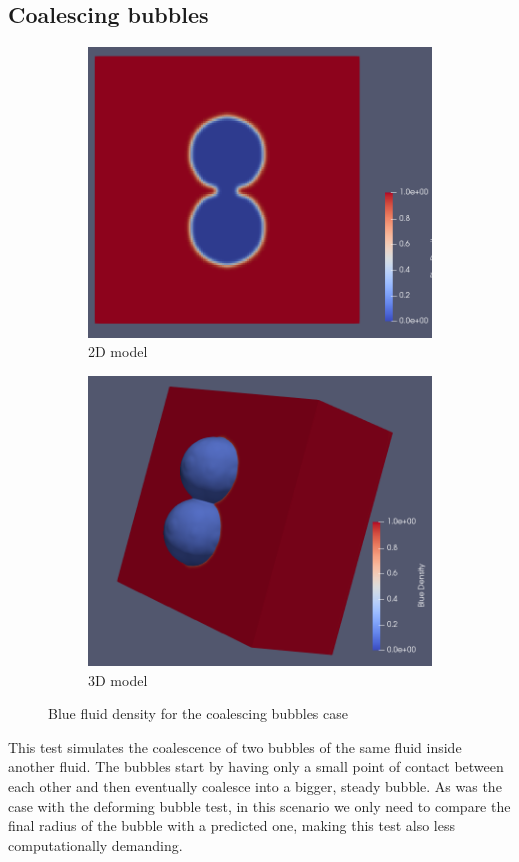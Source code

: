 \documentclass[12pt, openany]{book}
\begin{document}
\subsection{Coalescing bubbles}
\begin{figure}[H]
	\centering
	\begin{subfigure}{.49\textwidth}
		\includegraphics[width=\linewidth]{Resources/Images/coal.png}
		\caption{2D model}
	\end{subfigure}
	\begin{subfigure}{.49\textwidth}
		\includegraphics[width=\linewidth]{Resources/Images/coal3d.png}
		\caption{3D model}
	\end{subfigure} 
	\caption{Blue fluid density for the coalescing bubbles case}
	\label{fig:coalescence}
\end{figure} 
This test simulates the coalescence of two bubbles of the same fluid inside another fluid. The bubbles start by having only a small point of contact between each other and then eventually coalesce into a bigger, steady bubble. As was the case with the deforming bubble test, in this scenario we only need to compare the final radius of the bubble with a predicted one, making this test also less computationally demanding. 
\end{document}

